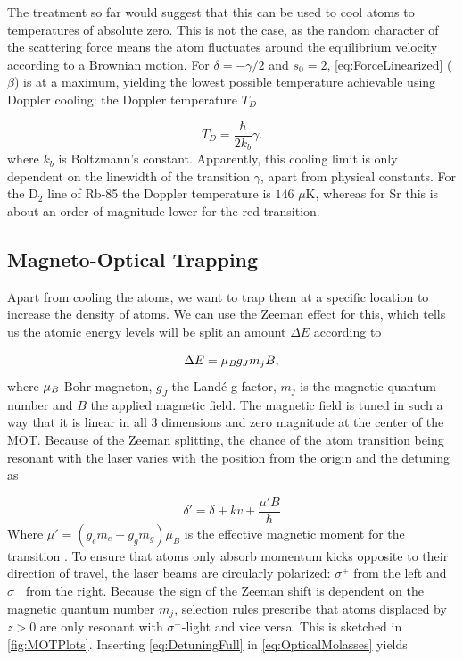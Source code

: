 The treatment so far would suggest that this can be used to cool atoms to temperatures of absolute zero. 
This is not the case, as the random character of the scattering force means the atom fluctuates around the equilibrium velocity according to a Brownian motion. 
For $\delta=-\gamma/2$ and $s_0 =2$, \cref{eq:ForceLinearized} ($\beta$) is at a maximum, yielding the lowest possible temperature achievable using Doppler cooling: the Doppler temperature $T_D$ \cite{Metcalf1999}

\begin{equation}\label{eq:DopplerTemperature}
	T_D = \frac{\hbar}{2k_b} \gamma.
\end{equation}
where $k_b$ is Boltzmann's constant. Apparently, this cooling limit is only dependent on the linewidth of the transition $\gamma$, apart from physical constants. 
For the D$_2$ line of Rb-85 the Doppler temperature is $146$ $\mu$K, whereas for Sr this is about an order of magnitude lower for the red transition.

\subsection{Magneto-Optical Trapping}

Apart from cooling the atoms, we want to trap them at a specific location to increase the density of atoms. 
We can use the Zeeman effect for this, which tells us the atomic energy levels will be split an amount $\Delta E$ according to \cite{Griffiths2004}

\begin{equation}\label{eq:Zeeman}
	\Delta E = \mu_{\emph{B}} g_J m_j B,
\end{equation}
where $\mu_{\emph{B}}$ Bohr magneton, $g_J$ the Landé g-factor, $m_j$ is the magnetic quantum number and $B$ the applied magnetic field. 
The magnetic field is tuned in such a way that it is linear in all 3 dimensions and zero magnitude at the center of the \ac{MOT}.
Because of the Zeeman splitting, the chance of the atom transition being resonant with the laser varies with the position from the origin and the detuning as \cite{Kowalski2010}

\begin{equation}\label{eq:DetuningFull}
	\delta' = \delta + k v + \frac{\mu'B}{\hbar}
\end{equation}
Where $\mu' = (g_e m_e-g_g m_g)\mu_B$ is the effective magnetic moment for the transition \cite{Kowalski2010}. 
To ensure that atoms only absorb momentum kicks opposite to their direction of travel, the laser beams are circularly polarized: $\sigma^+$ from the left and $\sigma^-$ from the right. Because the sign of the Zeeman shift is dependent on the magnetic quantum number $m_j$, selection rules prescribe that atoms displaced by $z>0$ are only resonant with $\sigma^-$-light and vice versa.
This is sketched in \cref{fig:MOTPlots}. Inserting \cref{eq:DetuningFull} in \cref{eq:OpticalMolasses} yields

